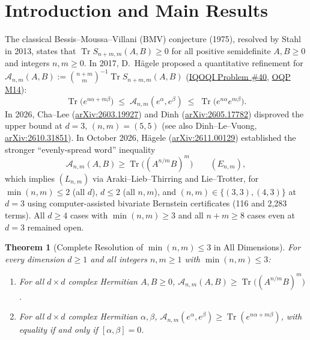 \documentclass[11pt,a4paper]{article}
\newtheorem{theorem}{Theorem}[section]
\theoremstyle{remark}
\newcommand{\Tr}{\operatorname{Tr}}
\begin{document}
\section{Introduction and Main Results}

The classical Bessis--Moussa--Villani (BMV) conjecture (1975), resolved by Stahl in 2013, states that $\Tr S_{n+m,m}(A,B)\ge 0$ for all positive semidefinite $A,B\ge 0$ and integers $n,m\ge 0$. In 2017, D.~H\"agele proposed a quantitative refinement for $\mathcal{A}_{n,m}(A,B):=\binom{n+m}{m}^{-1}\Tr S_{n+m,m}(A,B)$ (\href{https://oqp.iqoqi.oeaw.ac.at/open-quantum-problems}{IQOQI Problem \#40}, \href{https://openquantumproblems.com/p/M14}{OQP M14}):
\[
\Tr\!\big(e^{n\alpha+m\beta}\big)\;\le\;\mathcal{A}_{n,m}(e^\alpha,e^\beta)\;\le\;\Tr\!\big(e^{n\alpha}e^{m\beta}\big).
\]
In 2026, Cha--Lee (\href{https://arxiv.org/abs/2603.19927}{arXiv:2603.19927}) and Dinh (\href{https://arxiv.org/html/2605.17782v1}{arXiv:2605.17782}) disproved the upper bound at $d=3,\,(n,m)=(5,5)$ (see also Dinh--Le--Vuong, \href{https://arxiv.org/html/2610.31851v1}{arXiv:2610.31851}). In October 2026, H\"agele (\href{https://arxiv.org/html/2611.00129v1}{arXiv:2611.00129}) established the stronger ``evenly-spread word'' inequality
\begin{equation}\label{eq:Enm}
  \mathcal{A}_{n,m}(A,B) \ge \Tr\!\big((A^{n/m}B)^m\big) \qquad (E_{n,m}),
\end{equation}
which implies $(L_{n,m})$ via Araki--Lieb--Thirring and Lie--Trotter, for $\min(n,m)\le 2$ (all $d$), $d\le 2$ (all $n,m$), and $(n,m)\in\{(3,3),(4,3)\}$ at $d=3$ using computer-assisted bivariate Bernstein certificates (116 and 2,283 terms). All $d\ge 4$ cases with $\min(n,m)\ge 3$ and all $n+m\ge 8$ cases even at $d=3$ remained open.

\begin{theorem}[Complete Resolution of $\min(n,m)\le 3$ in All Dimensions]\label{thm:min3}
For every dimension $d\ge 1$ and all integers $n,m\ge 1$ with $\min(n,m)\le 3$:
\begin{enumerate}
  \item For all $d\times d$ complex Hermitian $A,B\ge 0$, $\mathcal{A}_{n,m}(A,B) \ge \Tr\!\big((A^{n/m}B)^m\big)$.
  \item For all $d\times d$ complex Hermitian $\alpha,\beta$, $\mathcal{A}_{n,m}(e^\alpha,e^\beta)\ge\Tr(e^{n\alpha+m\beta})$, with equality if and only if $[\alpha,\beta]=0$.
\end{enumerate}
\end{theorem}
\end{document}
